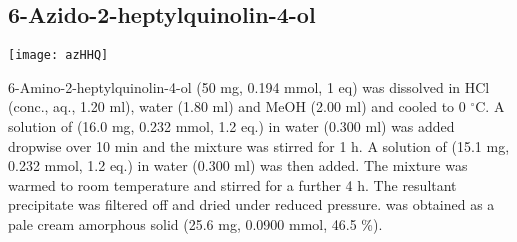 {{{{\subsection{6-Azido-2-heptylquinolin-4-ol }

\begin{scheme}[H]
	\begin{center}
		\texttt{[image: azHHQ]}
	\end{center}
\end{scheme}

6-Amino-2-heptylquinolin-4-ol  (50 mg, 0.194 mmol, 1 eq) was dissolved in HCl (conc., aq., 1.20 ml), water (1.80 ml) and MeOH (2.00 ml) and cooled to 0 $^{\circ}$C. A solution of  (16.0 mg, 0.232 mmol, 1.2 eq.) in water (0.300 ml) was added dropwise over 10 min and the mixture was stirred for 1 h. A solution of  (15.1 mg, 0.232 mmol, 1.2 eq.) in water (0.300 ml) was then added. The mixture was warmed to room temperature and stirred for a further 4 h. The resultant precipitate was filtered off and dried under reduced pressure.  was obtained as a pale cream amorphous solid (25.6 mg, 0.0900 mmol, 46.5 \%).
\\[1\baselineskip]
\\[1\baselineskip]
\\[1\baselineskip]
}}}}
